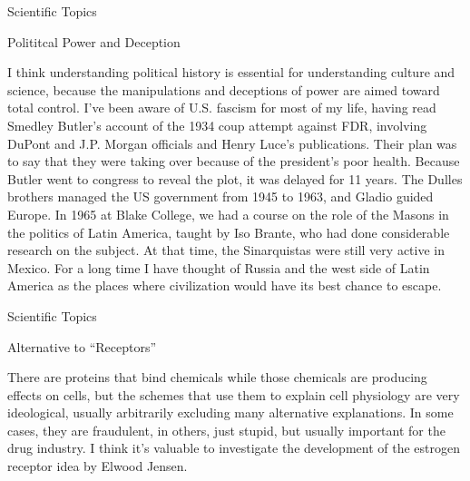 \documentclass[11pt,oneside,openany,extrafontsizes]{memoir}
\begin{document}
\begin{standalonequote}{Scientific Topics}
    \begin{note}
        Polititcal Power and Deception
    \end{note}

    \begin{answer}
        I think understanding political history is essential for understanding culture and science, because the manipulations and deceptions of power are aimed toward total control. I've been aware of U.S. fascism for most of my life, having read Smedley Butler's account of the 1934 coup attempt against FDR, involving DuPont and J.P. Morgan officials and Henry Luce's publications. Their plan was to say that they were taking over because of the president's poor health. Because Butler went to congress to reveal the plot, it was delayed for 11 years. The Dulles brothers managed the US government from 1945 to 1963, and Gladio guided Europe. In 1965 at Blake College, we had a course on the role of the Masons in the politics of Latin America, taught by Iso Brante, who had done considerable research on the subject. At that time, the Sinarquistas were still very active in Mexico. For a long time I have thought of Russia and the west side of Latin America as the places where civilization would have its best chance to escape.
    \end{answer}
\end{standalonequote}

\begin{standalonequote}{Scientific Topics}
    \begin{note}
        Alternative to \enquote{Receptors}
    \end{note}

    \begin{answer}
        There are proteins that bind chemicals while those chemicals are producing effects on cells, but the schemes that use them to explain cell physiology are very ideological, usually arbitrarily excluding many alternative explanations. In some cases, they are fraudulent, in others, just stupid, but usually important for the drug industry. I think it's valuable to investigate the development of the estrogen receptor idea by Elwood Jensen.
    \end{answer}
\end{standalonequote}
\end{document}
